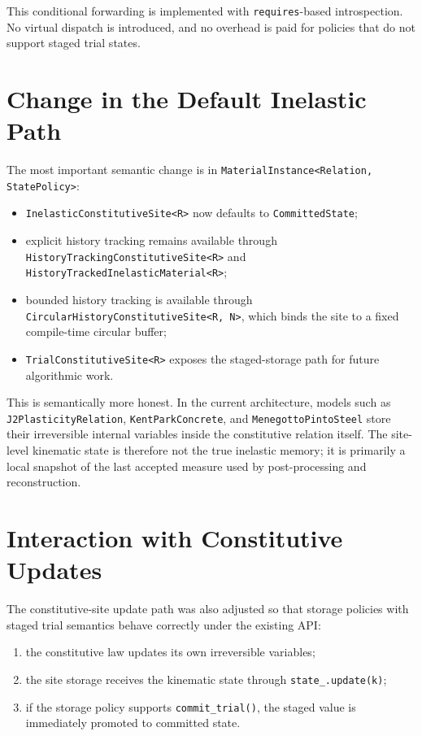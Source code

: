 This conditional forwarding is implemented with \texttt{requires}-based
introspection.  No virtual dispatch is introduced, and no overhead is paid for
policies that do not support staged trial states.

\section{Change in the Default Inelastic Path}

The most important semantic change is in
\texttt{MaterialInstance<Relation, StatePolicy>}:

\begin{itemize}
  \item \texttt{InelasticConstitutiveSite<R>} now defaults to
        \texttt{CommittedState};
  \item explicit history tracking remains available through
        \texttt{HistoryTrackingConstitutiveSite<R>} and
        \texttt{HistoryTrackedInelasticMaterial<R>};
  \item bounded history tracking is available through
        \texttt{CircularHistoryConstitutiveSite<R, N>}, which binds the site to
        a fixed compile-time circular buffer;
  \item \texttt{TrialConstitutiveSite<R>} exposes the staged-storage path for
        future algorithmic work.
\end{itemize}

This is semantically more honest.  In the current architecture, models such as
\texttt{J2PlasticityRelation}, \texttt{KentParkConcrete}, and
\texttt{MenegottoPintoSteel} store their irreversible internal variables inside
the constitutive relation itself.  The site-level kinematic state is therefore
not the true inelastic memory; it is primarily a local snapshot of the last
accepted measure used by post-processing and reconstruction.

\section{Interaction with Constitutive Updates}

The constitutive-site update path was also adjusted so that storage policies
with staged trial semantics behave correctly under the existing API:

\begin{enumerate}
  \item the constitutive law updates its own irreversible variables;
  \item the site storage receives the kinematic state through
        \texttt{state\_.update(k)};
  \item if the storage policy supports \texttt{commit\_trial()}, the staged
        value is immediately promoted to committed state.
\end{enumerate}

